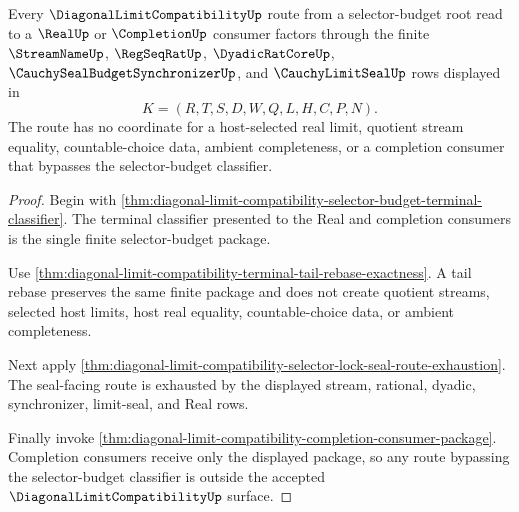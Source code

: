 \begin{theorem}
\label{thm:diagonal-limit-compatibility-real-completion-route-nonescape}
Every $\DiagonalLimitCompatibilityUp$ route from a selector-budget root read to a $\RealUp$ or $\CompletionUp$ consumer factors through the finite $\StreamNameUp$, $\RegSeqRatUp$, $\DyadicRatCoreUp$, $\CauchySealBudgetSynchronizerUp$, and $\CauchyLimitSealUp$ rows displayed in
$$
K=(R,T,S,D,W,Q,L,H,C,P,N).
$$
The route has no coordinate for a host-selected real limit, quotient stream equality, countable-choice data, ambient completeness, or a completion consumer that bypasses the selector-budget classifier.
\end{theorem}
\begin{proof}
Begin with \autoref{thm:diagonal-limit-compatibility-selector-budget-terminal-classifier}. The terminal classifier presented to the Real and completion consumers is the single finite selector-budget package.

Use \autoref{thm:diagonal-limit-compatibility-terminal-tail-rebase-exactness}. A tail rebase preserves the same finite package and does not create quotient streams, selected host limits, host real equality, countable-choice data, or ambient completeness.

Next apply \autoref{thm:diagonal-limit-compatibility-selector-lock-seal-route-exhaustion}. The seal-facing route is exhausted by the displayed stream, rational, dyadic, synchronizer, limit-seal, and Real rows.

Finally invoke \autoref{thm:diagonal-limit-compatibility-completion-consumer-package}. Completion consumers receive only the displayed package, so any route bypassing the selector-budget classifier is outside the accepted $\DiagonalLimitCompatibilityUp$ surface.
\end{proof}

